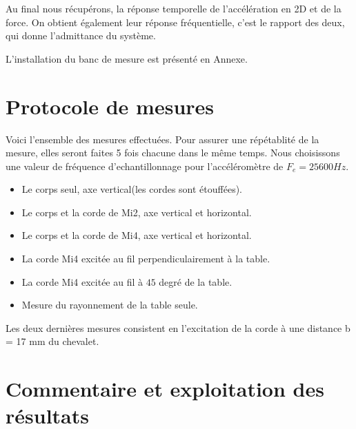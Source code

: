 Au final nous récupérons, la réponse temporelle de l'accélération en 2D et de la force. On obtient également leur réponse fréquentielle, c'est le rapport des deux, qui donne l'admittance du système.

L'installation du banc de mesure est présenté en Annexe. %


\section{Protocole de mesures}
Voici l'ensemble des mesures effectuées. Pour assurer une répétablité de la mesure, elles seront faites 5 fois chacune dans le même temps. Nous choisissons une valeur de fréquence d'echantillonnage pour l'accéléromètre de  $F_e = 25600Hz$.
\begin{itemize}
\item Le corps seul, axe vertical(les cordes sont étouffées).
\item Le corps et la corde de Mi2, axe vertical et horizontal.
\item Le corps et la corde de Mi4, axe vertical et horizontal.
\item La corde Mi4 excitée au fil perpendiculairement à la table.
\item La corde Mi4 excitée au fil à $45$ degré de la table.
\item Mesure du rayonnement de la table seule.
\end{itemize}
Les deux dernières mesures consistent en l'excitation de la corde à une distance b = 17 mm du chevalet. 

\section{Commentaire et exploitation des résultats}
